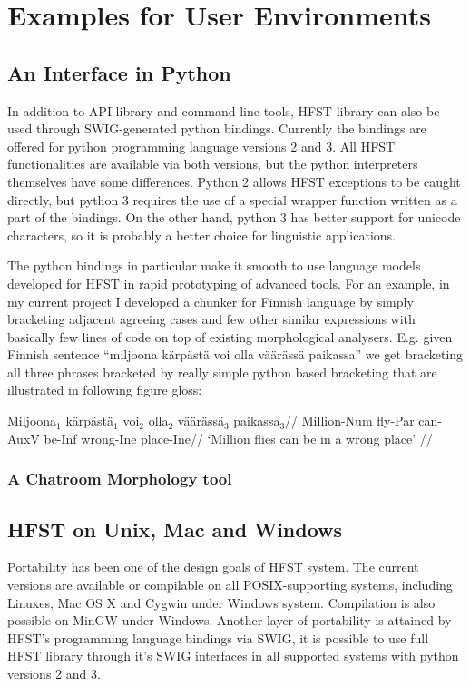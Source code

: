 \documentclass{llncs}
\begin{document}
\section{Examples for User Environments}

\subsection{An Interface in Python}

In addition to API library and command line tools, HFST library can also be used
through SWIG-generated python bindings. Currently the bindings are offered for
python programming language versions 2 and 3. All HFST functionalities are available
via both versions, but the python interpreters themselves have some differences.
Python 2 allows HFST exceptions to be caught directly, but python 3 requires the use
of a special wrapper function written as a part of the bindings. On the other hand, 
python 3 has better support for unicode characters, so it is probably a better choice
for linguistic applications.

The python bindings in particular make it smooth to use language models
developed for HFST in rapid prototyping of advanced tools. For an example, in
my current project I developed a chunker for Finnish language by simply
bracketing adjacent agreeing cases and few other similar expressions with
basically few lines of code on top of existing morphological analysers. E.g.
given Finnish sentence ``miljoona kärpästä voi olla väärässä paikassa'' we get
bracketing all three phrases bracketed by really simple python based bracketing
that are illustrated in following figure gloss:

\ex
\begingl
\gla Miljoona$_1$ kärpästä$_1$ voi$_2$ olla$_2$ väärässä$_3$ paikassa$_3$//
\glb Million-{\sc Num} fly-{\sc Par} can-{\sc AuxV} be-{\sc Inf} wrong-{\sc Ine} place-{\sc Ine}//
\glft `Million flies can be in a wrong place' //
\endgl
\xe


\subsubsection{A Chatroom Morphology tool}

\subsection{HFST on Unix, Mac and Windows}

Portability has been one of the design goals of HFST system. The current 
versions are available or compilable on all POSIX-supporting systems, including
Linuxes, Mac OS X and Cygwin under Windows system. Compilation is also possible 
on MinGW under Windows. Another layer of portability
is attained by HFST's programming language bindings via SWIG, it is possible to
use full HFST library through it's SWIG interfaces in all supported systems with
python versions 2 and 3.
\end{document}
